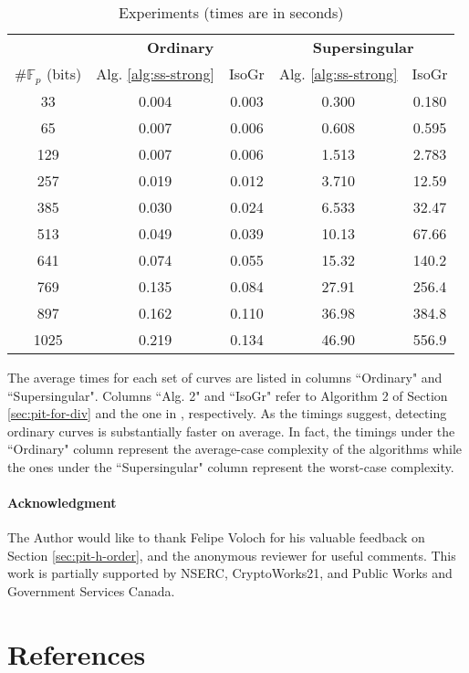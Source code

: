 \documentclass[review]{elsarticle}
\theoremstyle{plain}
\theoremstyle{definition}
\def\F{\ensuremath{\mathbb{F}}}
\begin{document}
\begin{table}[H]
	\centering
	\small
	\begin{tabular}{ccccc}
		& \multicolumn{2}{c}{\bfseries Ordinary} & \multicolumn{2}{c}{\bfseries Supersingular} \\
		\cmidrule(lr){2-3} \cmidrule(lr){4-5} 
		$\#\F_p$ (bits) & Alg. \ref{alg:ss-strong} & IsoGr & Alg. 
		\ref{alg:ss-strong} & IsoGr \\
		\midrule[0.7pt]
		33 & 0.004 & 0.003 & 0.300 & 0.180 \\
		65 & 0.007 & 0.006 & 0.608 & 0.595 \\
		129 & 0.007 & 0.006 & 1.513 & 2.783 \\
		257 & 0.019 & 0.012 & 3.710 & 12.59 \\
		385 & 0.030 & 0.024 & 6.533 & 32.47 \\
		513 & 0.049 & 0.039 & 10.13 & 67.66 \\
		641 & 0.074 & 0.055 & 15.32 & 140.2 \\
		769 & 0.135 & 0.084 & 27.91 & 256.4 \\
		897 & 0.162 & 0.110 & 36.98 & 384.8 \\
		1025 & 0.219 & 0.134 & 46.90 & 556.9 \\		
		\midrule[0.7pt]
	\end{tabular}
	\caption{Experiments (times are in seconds)}
	\label{table:exper}
\end{table}

The average times for each set of curves are listed in columns ``Ordinary" and ``Supersingular". 
Columns ``Alg. 2" and ``IsoGr" refer to Algorithm 2 of Section \ref{sec:pit-for-div} 
and the one in \cite{sutherland2012}, respectively. As the timings suggest, detecting ordinary 
curves is substantially faster on average. In fact, the timings under the ``Ordinary" column 
represent the average-case complexity of the algorithms while the ones under the ``Supersingular" 
column represent the worst-case complexity.

\paragraph{Acknowledgment}
The Author would like to thank Felipe Voloch for his valuable feedback on Section 
\ref{sec:pit-h-order}, and the anonymous reviewer for useful comments. This work is partially 
supported by NSERC, CryptoWorks21, and Public Works and Government Services Canada.




\section*{References}


\end{document}
